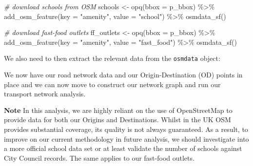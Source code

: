\documentclass[
]{book}
\newenvironment{Shaded}{\begin{snugshade}}{\end{snugshade}}
\newcommand{\AttributeTok}[1]{\textcolor[rgb]{0.77,0.63,0.00}{#1}}
\newcommand{\CommentTok}[1]{\textcolor[rgb]{0.56,0.35,0.01}{\textit{#1}}}
\newcommand{\FunctionTok}[1]{\textcolor[rgb]{0.00,0.00,0.00}{#1}}
\newcommand{\NormalTok}[1]{#1}
\newcommand{\OtherTok}[1]{\textcolor[rgb]{0.56,0.35,0.01}{#1}}
\newcommand{\SpecialCharTok}[1]{\textcolor[rgb]{0.00,0.00,0.00}{#1}}
\newcommand{\StringTok}[1]{\textcolor[rgb]{0.31,0.60,0.02}{#1}}
\begin{document}
\begin{Shaded}
\begin{Highlighting}[]
\CommentTok{\# download schools from OSM}
\NormalTok{schools }\OtherTok{\textless{}{-}} \FunctionTok{opq}\NormalTok{(}\AttributeTok{bbox =}\NormalTok{ p\_bbox) }\SpecialCharTok{\%\textgreater{}\%}
    \FunctionTok{add\_osm\_feature}\NormalTok{(}\AttributeTok{key =} \StringTok{"amenity"}\NormalTok{, }\AttributeTok{value =} \StringTok{"school"}\NormalTok{) }\SpecialCharTok{\%\textgreater{}\%}
    \FunctionTok{osmdata\_sf}\NormalTok{()}

\CommentTok{\# download fast{-}food outlets}
\NormalTok{ff\_outlets }\OtherTok{\textless{}{-}} \FunctionTok{opq}\NormalTok{(}\AttributeTok{bbox =}\NormalTok{ p\_bbox) }\SpecialCharTok{\%\textgreater{}\%}
    \FunctionTok{add\_osm\_feature}\NormalTok{(}\AttributeTok{key =} \StringTok{"amenity"}\NormalTok{, }\AttributeTok{value =} \StringTok{"fast\_food"}\NormalTok{) }\SpecialCharTok{\%\textgreater{}\%}
    \FunctionTok{osmdata\_sf}\NormalTok{()}
\end{Highlighting}
\end{Shaded}

We also need to then extract the relevant data from the \texttt{osmdata} object:

\begin{Shaded}
\end{Shaded}

We now have our road network data and our Origin-Destination (OD) points in place and we can now move to construct our network graph and run our transport network analysis.

\textbf{Note}
In this analysis, we are highly reliant on the use of OpenStreetMap to provide data for both our Origins and Destinations. Whilst in the UK OSM provides substantial coverage, its quality is not always guaranteed. As a result, to improve on our current methodology in future analysis, we should investigate into a more official school data set or at least validate the number of schools against City Council records. The same applies to our fast-food outlets.
\end{document}
